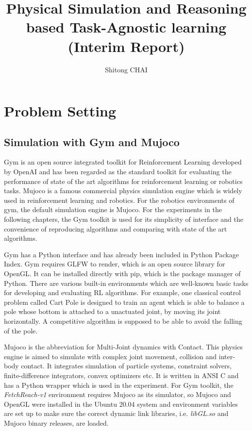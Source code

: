 \documentclass[a4paper, 12pt]{report}
\title{Physical Simulation and Reasoning based Task-Agnostic learning (Interim Report)}
\date{}
\author{Shitong CHAI}
\begin{document}
\maketitle
\tableofcontents

\chapter {Problem Setting}

    \section {Simulation with Gym and Mujoco}
    Gym\cite{1606.01540} is an open source integrated toolkit for Reinforcement Learning developed by OpenAI and has been regarded as the standard toolkit for evaluating the performance of state of the art algorithms for reinforcement learning or robotics tasks. Mujoco\cite{Todorov_mujoco:a} is a famous commercial physics simulation engine which is widely used in reinforcement learning and robotics. For the robotics environments of gym, the default simulation engine is Mujoco. For the experiments in the following chapters, the Gym toolkit is used for its simplicity of interface and the convenience of reproducing algorithms and comparing with state of the art algorithms.

    Gym has a Python interface and has already been included in Python Package Index. Gym requires GLFW to render, which is an open source library for OpenGL. It can be installed directly with pip, which is the package manager of Python. There are various built-in environments which are well-known basic tasks for developing and evaluating RL algorithms. For example, one classical control problem called Cart Pole is designed to train an agent which is able to balance a pole whose bottom is attached to a unactuated joint, by moving its joint horizontally. A competitive algorithm is supposed to be able to avoid the falling of the pole.

    Mujoco is the abbreviation for Multi-Joint dynamics with Contact. This physics engine is aimed to simulate with complex joint movement, collision and inter-body contact. It integrates simulation of particle systems, constraint solvers, finite-difference integrators, convex optimizers etc. It is written in ANSI C and has a Python wrapper which is used in the experiment. For Gym toolkit, the \emph{FetchReach-v1} environment requires Mujoco as its simulator, so Mujoco and OpenGL were installed in the Ubuntu 20.04 system and environment variables are set up to make sure the correct dynamic link libraries, i.e. \emph{libGL.so} and Mujoco binary releases, are loaded.
\end{document}
